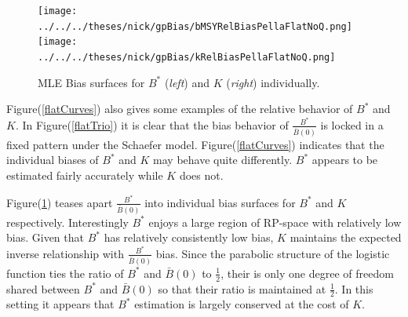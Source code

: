 \documentclass[12pt]{article}
\begin{document}
%
\clearpage
\begin{figure}[h!]
\texttt{[image: ../../../theses/nick/gpBias/bMSYRelBiasPellaFlatNoQ.png]}
\texttt{[image: ../../../theses/nick/gpBias/kRelBiasPellaFlatNoQ.png]}
\caption{\label{flatRat}
MLE Bias surfaces for $B^*$ (\emph{left}) and $K$ (\emph{right}) individually.
}
\end{figure}

Figure(\ref{flatCurves}) also gives some examples of the relative behavior of 
$B^*$ and $K$. In Figure(\ref{flatTrio}) it is clear that the bias behavior of 
$\frac{B^*}{\bar B(0)}$ is locked in a fixed pattern under the Schaefer model. 
Figure(\ref{flatCurves}) indicates that the individual biases of $B^*$ and $K$ 
may behave quite differently. $B^*$ appears to be estimated fairly accurately 
while $K$ does not.

%
Figure(\ref{flatRat}) teases apart $\frac{B^*}{\bar B(0)}$ into individual bias 
surfaces for $B^*$ and $K$ respectively. Interestingly $B^*$ enjoys a large region 
of RP-space with relatively low bias. Given that $B^*$ has relatively consistently
low bias, $K$ maintains the expected inverse relationship with $\frac{B^*}{\bar B(0)}$ 
bias. Since the parabolic structure of the logistic function ties the ratio of 
$B^*$ and $\bar B(0)$ to $\frac{1}{2}$, their is only one degree of freedom 
shared between $B^*$ and $\bar B(0)$ so that their ratio is maintained at $\frac{1}{2}$. 
In this setting it appears that $B^*$ estimation is largely conserved at the 
cost of $K$.


\end{document}
